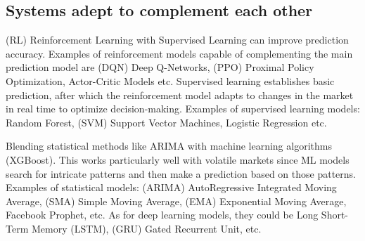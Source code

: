\documentclass[10pt,twoside,english,a4paper]{article}
\begin{document}
\subsection{Systems adept to complement each other}
(RL) Reinforcement Learning with Supervised Learning can improve prediction accuracy. Examples of reinforcement models capable of complementing the main prediction model are (DQN) Deep Q-Networks, (PPO) Proximal Policy Optimization, Actor-Critic Models etc. Supervised learning establishes basic prediction, after which the reinforcement model adapts to changes in the market in real time to optimize decision-making. Examples of supervised learning models: Random Forest, (SVM) Support Vector Machines, Logistic Regression etc.
\par Blending statistical methods like ARIMA with machine learning algorithms (XGBoost). This works particularly well with volatile markets since ML models search for intricate patterns and then make a prediction based on those patterns. Examples of statistical models: (ARIMA) AutoRegressive Integrated Moving Average, (SMA) Simple Moving Average, (EMA) Exponential Moving Average, Facebook Prophet, etc. As for deep learning models, they could be Long Short-Term Memory (LSTM), (GRU) Gated Recurrent Unit, etc. \cite{adept_sys}\cite{adept_sys1}\cite{adept_sys2}\cite{adept_sys3}

\newpage



\end{document}
